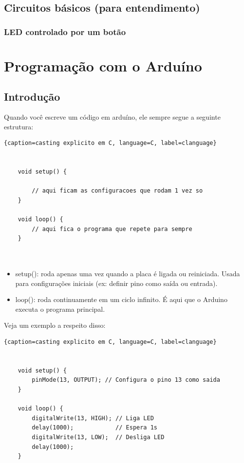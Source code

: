 \documentclass{report}
\begin{document}
	\section{Circuitos básicos (para entendimento)}
	\subsection{LED controlado por um botão}
	
	\chapter{Programação com o Arduíno}
	\section{Introdução}
	
	
	Quando você escreve um código em arduíno, ele sempre segue a seguinte estrutura:
	
	
	\begin{center}
		
		\begin{lstlisting}{caption=casting explicito em C, language=C, label=clanguage}
			
					
	void setup() {
		
		// aqui ficam as configuracoes que rodam 1 vez so
	}
				
	void loop() {
		// aqui fica o programa que repete para sempre
	}
	
			
		\end{lstlisting}
	\end{center}
	
	

	
	\begin{itemize}
		\item setup(): roda apenas uma vez quando a placa é ligada ou reiniciada. Usada para configurações iniciais (ex: definir pino como saída ou entrada).
		\item loop(): roda continuamente em um ciclo infinito. É aqui que o Arduino executa o programa principal.
	\end{itemize}
	
	Veja um exemplo a respeito disso:
	
		
	\begin{center}
		
		\begin{lstlisting}{caption=casting explicito em C, language=C, label=clanguage}
			
			
	void setup() {
		pinMode(13, OUTPUT); // Configura o pino 13 como saida
	}

	void loop() {
		digitalWrite(13, HIGH); // Liga LED
		delay(1000);            // Espera 1s
		digitalWrite(13, LOW);  // Desliga LED
		delay(1000);
	}

			
			
		\end{lstlisting}
	\end{center}
	
\end{document}
